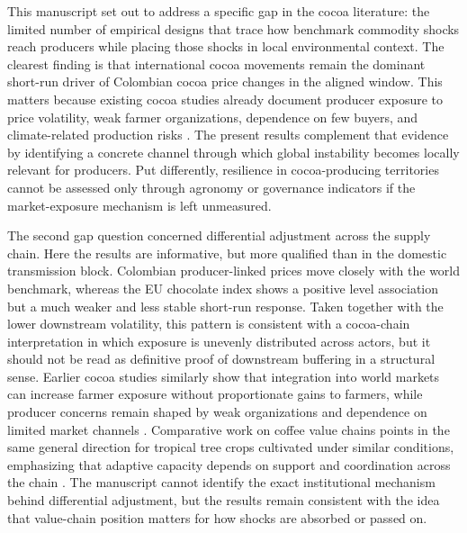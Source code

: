 \documentclass[11pt]{article}
\begin{document}
This manuscript set out to address a specific gap in the cocoa literature: the limited number of empirical designs that trace how benchmark commodity shocks reach producers while placing those shocks in local environmental context. The clearest finding is that international cocoa movements remain the dominant short-run driver of Colombian cocoa price changes in the aligned window. This matters because existing cocoa studies already document producer exposure to price volatility, weak farmer organizations, dependence on few buyers, and climate-related production risks \citep{Mithofer2017,AkrofiAtitianti2018}. The present results complement that evidence by identifying a concrete channel through which global instability becomes locally relevant for producers. Put differently, resilience in cocoa-producing territories cannot be assessed only through agronomy or governance indicators if the market-exposure mechanism is left unmeasured.

The second gap question concerned differential adjustment across the supply chain. Here the results are informative, but more qualified than in the domestic transmission block. Colombian producer-linked prices move closely with the world benchmark, whereas the EU chocolate index shows a positive level association but a much weaker and less stable short-run response. Taken together with the lower downstream volatility, this pattern is consistent with a cocoa-chain interpretation in which exposure is unevenly distributed across actors, but it should not be read as definitive proof of downstream buffering in a structural sense. Earlier cocoa studies similarly show that integration into world markets can increase farmer exposure without proportionate gains to farmers, while producer concerns remain shaped by weak organizations and dependence on limited market channels \citep{TsowouGayi2019,Mithofer2017}. Comparative work on coffee value chains points in the same general direction for tropical tree crops cultivated under similar conditions, emphasizing that adaptive capacity depends on support and coordination across the chain \citep{Morales2022,Verburg2019}. The manuscript cannot identify the exact institutional mechanism behind differential adjustment, but the results remain consistent with the idea that value-chain position matters for how shocks are absorbed or passed on.
\end{document}

